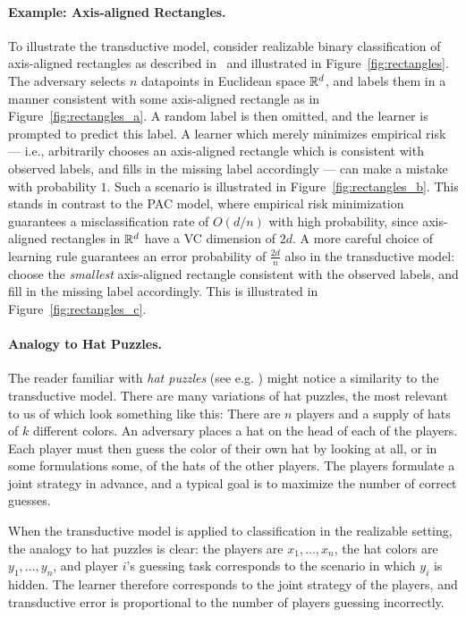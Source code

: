 \paragraph{Example: Axis-aligned Rectangles.} To illustrate the transductive model, consider realizable binary classification of axis-aligned rectangles as described in~\cite{haussler_predicting_1994} and illustrated in Figure~\ref{fig:rectangles}. The adversary selects $n$ datapoints in Euclidean space $\mathbb{R}^d$, and labels them  in a manner consistent with some axis-aligned rectangle as in Figure~\ref{fig:rectangles_a}. A random label is then omitted, and the learner is prompted to predict this label. A learner which merely minimizes empirical risk --- i.e., arbitrarily chooses an axis-aligned rectangle which is consistent with observed labels, and fills in the missing label accordingly --- can make a mistake with probability $1$. Such a scenario is illustrated in Figure~\ref{fig:rectangles_b}. This stands in contrast to the PAC model, where empirical risk minimization guarantees a misclassification rate of $O(d/n)$ with high probability, since axis-aligned rectangles in $\mathbb{R}^d$ have a VC dimension of $2d$. A more careful choice of learning rule guarantees an error probability of $\frac{2d}{n}$ also in the transductive model: choose the \emph{smallest} axis-aligned rectangle consistent with the observed labels, and fill in the missing label accordingly. This is illustrated in Figure~\ref{fig:rectangles_c}.



\paragraph{Analogy to Hat Puzzles.} The reader familiar with \emph{hat puzzles} (see e.g. \cite{krzywkowski_hat_2010,butler_hat_2009}) might notice a similarity to the transductive model. There are many variations of hat puzzles, the most relevant to us of which look something like this: There are $n$ players and a supply of hats of $k$ different colors. An adversary places a hat on the head of each of the players. Each player must then guess the color of their own hat by looking at all, or in some formulations some, of the hats of the other players. The players formulate a joint strategy in advance, and a typical goal is to maximize the number of correct guesses.

When the transductive model is applied to classification in the realizable setting, the  analogy to hat puzzles is clear: the players are $x_1,\ldots,x_n$, the hat colors are $y_1,\ldots,y_n$, and player $i$'s guessing task corresponds to the scenario in which $y_i$ is hidden. The learner  therefore corresponds to the joint strategy of the players, and transductive error is proportional to the number of players guessing incorrectly. 


